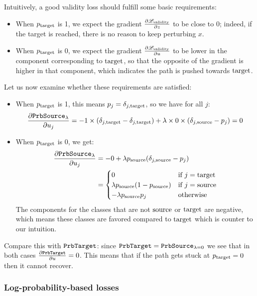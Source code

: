 \documentclass[../main.tex]{subfiles}
\begin{document}
Intuitively, a good validity loss should fulfill some basic requirements:
\begin{itemize}
\item When $p_{\mathrm{target}}$ is 1, we expect the gradient $\frac{\partial \mathscr{L}_\text{validity}}{\partial z}$ to be close to 0; indeed, if the target is reached, there is no reason to keep perturbing $x$.
\item When $p_{\mathrm{target}}$ is 0, we expect the gradient $\frac{\partial \mathscr{L}_\text{validity}}{\partial u}$ to be lower in the component corresponding to $\mathrm{target}$, so that the opposite of the gradient is higher in that component, which indicates the path is pushed towards $\mathrm{target}$.
\end{itemize}

Let us now examine whether these requirements are satisfied:
\begin{itemize}
    \item When $p_{\mathrm{target}}$ is 1, this means $p_j = \delta_{j, \mathrm{target}}$, so we have for all $j$:
          \begin{equation*}
\frac{\partial \mathtt{PrbSource}_{\lambda}}{\partial u_j} = -1 \times (\delta_{j, \mathrm{target}} -\delta_{j, \mathrm{target}}) + \lambda \times 0 \times (\delta_{j, \mathrm{source}} - p_j) = 0
          \end{equation*}
    \item When $p_{\mathrm{target}}$ is 0, we get:
          \begin{align*}
\frac{\partial \mathtt{PrbSource}_{\lambda}}{\partial u_j}
& = -0 + \lambda p_{\mathrm{source}} (\delta_{j, \mathrm{source}} - p_j)                        \\
               & = \begin{cases}
                       0                         & \text{if } j = \mathrm{target} \\
\lambda p_{\mathrm{source}} (1 - p_{\mathrm{source}}) & \text{if } j = \mathrm{source} \\
- \lambda p_{\mathrm{source}} p_j           & \text{otherwise}
                   \end{cases}
          \end{align*}
          The components for the classes that are not $\mathrm{source}$ or $\mathrm{target}$ are negative, which means these classes are favored compared to $\mathrm{target}$ which is counter to our intuition.
\end{itemize}

Compare this with $\mathtt{PrbTarget}$: since $\mathtt{PrbTarget} = \mathtt{PrbSource}_{\lambda=0}$ we see that in both cases $\frac{\partial \mathtt{PrbTarget}}{\partial u} = 0$.
This means that if the path gets stuck at $p_{\mathrm{target}} = 0$ then it cannot recover.

\subsubsection{Log-probability-based losses}
\end{document}
